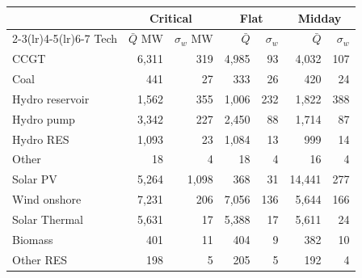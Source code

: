 \begin{tabular}{l r r r r r r}
\toprule
 & \multicolumn{2}{c}{Critical} & \multicolumn{2}{c}{Flat} & \multicolumn{2}{c}{Midday} \\
\cmidrule(lr){2-3}\cmidrule(lr){4-5}\cmidrule(lr){6-7}
Tech & $\bar Q$ MW & $\sigma_w$ MW & $\bar Q$ & $\sigma_w$ & $\bar Q$ & $\sigma_w$ \\
\midrule
CCGT & 6,311 & 319 & 4,985 & 93 & 4,032 & 107 \\
Coal & 441 & 27 & 333 & 26 & 420 & 24 \\
Hydro reservoir & 1,562 & 355 & 1,006 & 232 & 1,822 & 388 \\
Hydro pump & 3,342 & 227 & 2,450 & 88 & 1,714 & 87 \\
Hydro RES & 1,093 & 23 & 1,084 & 13 & 999 & 14 \\
Other & 18 & 4 & 18 & 4 & 16 & 4 \\
Solar PV & 5,264 & 1,098 & 368 & 31 & 14,441 & 277 \\
Wind onshore & 7,231 & 206 & 7,056 & 136 & 5,644 & 166 \\
Solar Thermal & 5,631 & 17 & 5,388 & 17 & 5,611 & 24 \\
Biomass & 401 & 11 & 404 & 9 & 382 & 10 \\
Other RES & 198 & 5 & 205 & 5 & 192 & 4 \\
\bottomrule
\end{tabular}